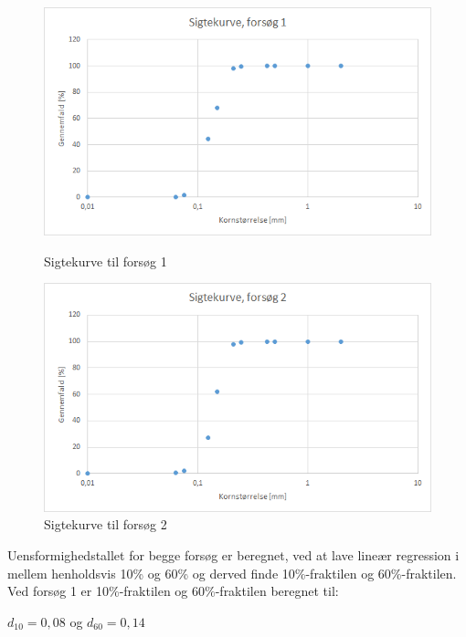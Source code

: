 \begin{figure}[htbp] \centering
	\begin{minipage}[b]{0.48\textwidth}\centering
		\includegraphics[width=1.0\textwidth]{billeder/sigtekurve1.png}
		\caption{Sigtekurve til forsøg 1}
		\label{fig:sigtekurve1}
	\end{minipage}\hfill
	\begin{minipage}[b]{0.48\textwidth}\centering
		\centering
		\includegraphics[width=1.0\textwidth]{billeder/sigtekurve2.png}
		\caption{Sigtekurve til forsøg 2}
		\label{fig:sigtekurve2}
	\end{minipage}
\end{figure}

Uensformighedstallet for begge forsøg er beregnet, ved at lave lineær regression i mellem henholdsvis 10\% og 60\% og derved finde 10\%-fraktilen og 60\%-fraktilen.
\newline
\newline
Ved forsøg 1 er 10\%-fraktilen og 60\%-fraktilen beregnet til: 
\begin{center}
	$d_{10} = 0,\!08$ og $d_{60} = 0,\!14$
\end{center} 

